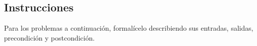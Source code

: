 \subsection*{Instrucciones}
Para los problemas a continuación, formalícelo describiendo sus entradas,
salidas, precondición y postcondición.
